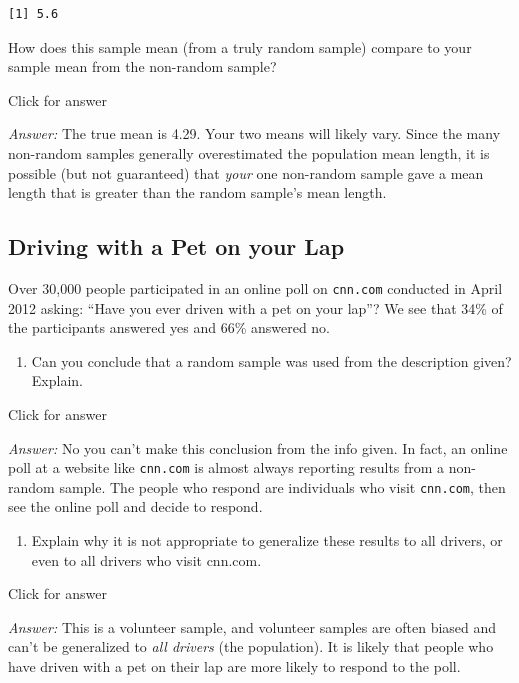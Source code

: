 \documentclass[
]{book}
\providecommand{\tightlist}{%
  \setlength{\itemsep}{0pt}\setlength{\parskip}{0pt}}
\begin{document}
\begin{verbatim}
[1] 5.6
\end{verbatim}

How does this sample mean (from a truly random sample) compare to your sample mean from the non-random sample?

Click for answer

\emph{Answer:} The true mean is 4.29. Your two means will likely vary. Since the many non-random samples generally overestimated the population mean length, it is possible (but not guaranteed) that \emph{your} one non-random sample gave a mean length that is greater than the random sample's mean length.

\hypertarget{driving-with-a-pet-on-your-lap}{%
\subsection{Driving with a Pet on your Lap}\label{driving-with-a-pet-on-your-lap}}

Over 30,000 people participated in an online poll on \texttt{cnn.com} conducted in April 2012 asking: ``Have you ever driven with a pet on your lap''? We see that 34\% of the participants answered yes and 66\% answered no.

\begin{enumerate}
\def\labelenumi{\alph{enumi}.}
\tightlist
\item
  Can you conclude that a random sample was used from the description given? Explain.
\end{enumerate}

Click for answer

\emph{Answer:} No you can't make this conclusion from the info given. In fact, an online poll at a website like \texttt{cnn.com} is almost always reporting results from a non-random sample. The people who respond are individuals who visit \texttt{cnn.com}, then see the online poll and decide to respond.

\begin{enumerate}
\def\labelenumi{\alph{enumi}.}
\setcounter{enumi}{1}
\tightlist
\item
  Explain why it is not appropriate to generalize these results to all drivers, or even to all drivers who visit cnn.com.
\end{enumerate}

Click for answer

\emph{Answer:} This is a volunteer sample, and volunteer samples are often biased and can't be generalized to \emph{all drivers} (the population). It is likely that people who have driven with a pet on their lap are more likely to respond to the poll.
\end{document}
